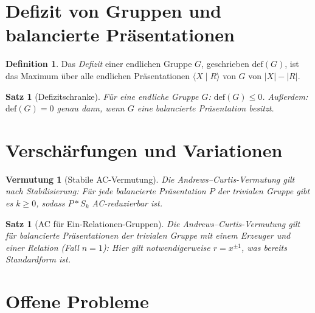 \documentclass[12pt,a4paper]{amsart}
\newtheorem{satz}[theorem]{Satz}
\newtheorem{vermutung}[theorem]{Vermutung}
\theoremstyle{definition}
\newtheorem{definition_de}[theorem]{Definition}
\theoremstyle{remark}
\begin{document}
\section{Defizit von Gruppen und balancierte Präsentationen}

\begin{definition_de}
Das \emph{Defizit} einer endlichen Gruppe $G$, geschrieben $\mathrm{def}(G)$, ist das
Maximum über alle endlichen Präsentationen $\langle X \mid R \rangle$ von $G$ von
$|X| - |R|$.
\end{definition_de}

\begin{satz}[Defizitschranke]\label{satz:defiz}
Für eine endliche Gruppe $G$: $\mathrm{def}(G) \leq 0$.
Außerdem: $\mathrm{def}(G) = 0$ genau dann, wenn $G$ eine balancierte Präsentation besitzt.
\end{satz}

\section{Verschärfungen und Variationen}

\begin{vermutung}[Stabile AC-Vermutung]\label{verm:stableAC}
Die Andrews--Curtis-Vermutung gilt nach \emph{Stabilisierung}: Für jede balancierte
Präsentation $P$ der trivialen Gruppe gibt es $k \geq 0$, sodass $P * S_k$ AC-reduzierbar ist.
\end{vermutung}

\begin{satz}[AC für Ein-Relationen-Gruppen]\label{satz:einrel}
Die Andrews--Curtis-Vermutung gilt für balancierte Präsentationen der trivialen Gruppe
mit einem Erzeuger und einer Relation (Fall $n=1$): Hier gilt notwendigerweise $r = x^{\pm 1}$,
was bereits Standardform ist.
\end{satz}

\section{Offene Probleme}
\end{document}

